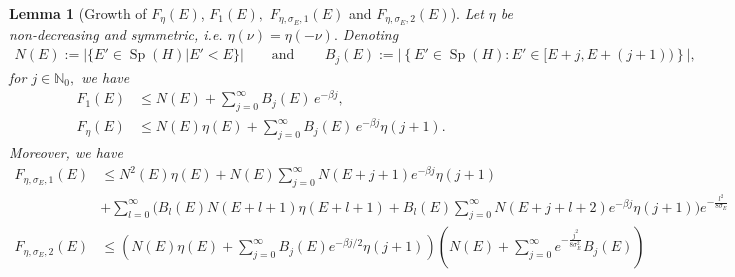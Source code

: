\documentclass[11pt]{amsart}
\newcommand{\nn}{\nonumber}
\newcommand{\1}{\mathbbm{1}}
\newcommand{\N}{\mathbb{N}}
\newcommand{\spec}{\operatorname{Sp}}
\newcommand{\bin}[1]{}
\theoremstyle{plain}
\newtheorem{lemma}[theorem]{Lemma}
\theoremstyle{definition}
\theoremstyle{remark}
\numberwithin{equation}{section}
\begin{document}
\begin{lemma}[Growth of $F_\eta(E)$, $F_1(E),$ $F_{\eta,\sigma_E,1}(E)$ and $F_{\eta,\sigma_E,2}(E)$]
\label{lem:GrowthF_eta}
Let $\eta$ be non-decreasing and symmetric, i.e. $\eta(\nu)=\eta(-\nu).$
Denoting \begin{align*}
   N(E):=|\{E'\in\spec(H)\big| E'< E\}|\qquad\text{and}\,\qquad B_j(E) := \left|\left\{ E'\in \spec(H): E'\in [E+j,E+(j+1))\right\}\right|,
\end{align*} for $j\in\N_0,$ 
we have
\begin{align}
\label{eq:F_etaF_1Growth}
   \nn F_1(E) &\le N(E) + \sum_{j=0}^{\infty} B_j(E)\, e^{-\beta j}, \\F_\eta(E) &\le N(E) \eta(E) + \sum_{j=0}^{\infty} B_j(E)\, e^{-\beta j}\eta(j+1). \end{align}
Moreover, we have
   \begin{align}
\label{eq:F_sigma_EGrowth}\nn F_{\eta,\sigma_E,1}(E)&\le  N^2(E)\eta(E) +N(E)\sum_{j=0}^{\infty} N(E+j+1)e^{-\beta j}\eta(j+1) \\&\nn+\sum_{l=0}^{\infty} \Big(B_l(E) N(E+l+1)\eta(E+l+1) + B_l(E)\sum_{j=0}^{\infty} N(E+j+l+2) e^{-\beta j}\eta(j+1)\Big)e^{-\frac{l^2}{8\sigma_E}}\\ 
    F_{\eta,\sigma_E,2}(E) &\le   \left(N(E) \eta(E) + \sum_{j=0}^{\infty} B_j(E) e^{-\beta j/2} \eta(j+1)\right)\left(N(E)+\sum_{j=0}^\infty e^{-\frac{j^2}{8\sigma^2_E}} B_j(E)\right)
\end{align}


\bin{Labelling the spectrum of $H$ in increasing order as $\spec(H) = \{E^{(k)}\}_{k\in\N_0}$ with $E^{(k+1)}\ge E^{(k)},$ we further assume that there exists $s\in\N$ and $\Delta>0$ such that
\begin{align}
\label{eq:GrowthConditionEigenEnergies}   E^{(k+s)} - E^{(k)} \ge \Delta
\end{align}
for all $k\in\N_0.$ Then we have
\begin{align}
\label{eq:GrowthFeta}
    F_\eta(E) \lesssim (E+h_0)\,\eta(E) + \sum_{j=0}^{\infty}e^{-\beta j}\eta(j+1),
\end{align}
where the $\lesssim$-notation hides a multiplicative constant which only depends on $s$ and $\Delta.$}
\end{lemma}
\end{document}
